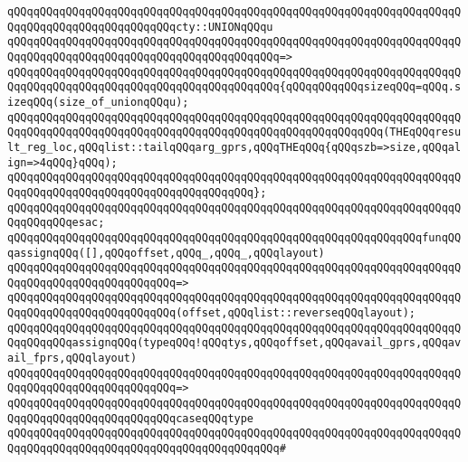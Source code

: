 \newline
\verb|qQQqqQQqqQQqqQQqqQQqqQQqqQQqqQQqqQQqqQQqqQQqqQQqqQQqqQQqqQQqqQQqqQQqqQQqqQQqqQQqqQQqqQQqqQQqqQQqcty::UNIONqQQqu|\newline
\verb|qQQqqQQqqQQqqQQqqQQqqQQqqQQqqQQqqQQqqQQqqQQqqQQqqQQqqQQqqQQqqQQqqQQqqQQqqQQqqQQqqQQqqQQqqQQqqQQqqQQqqQQqqQQqqQQq=>|\newline
\verb|qQQqqQQqqQQqqQQqqQQqqQQqqQQqqQQqqQQqqQQqqQQqqQQqqQQqqQQqqQQqqQQqqQQqqQQqqQQqqQQqqQQqqQQqqQQqqQQqqQQqqQQqqQQqqQQq{qQQqqQQqqQQqsizeqQQq=qQQq.sizeqQQq(size_of_unionqQQqu);|\newline
\newline
\verb|qQQqqQQqqQQqqQQqqQQqqQQqqQQqqQQqqQQqqQQqqQQqqQQqqQQqqQQqqQQqqQQqqQQqqQQqqQQqqQQqqQQqqQQqqQQqqQQqqQQqqQQqqQQqqQQqqQQqqQQqqQQqqQQq(THEqQQqresult_reg_loc,qQQqlist::tailqQQqarg_gprs,qQQqTHEqQQq{qQQqszb=>size,qQQqalign=>4qQQq}qQQq);|\newline
\verb|qQQqqQQqqQQqqQQqqQQqqQQqqQQqqQQqqQQqqQQqqQQqqQQqqQQqqQQqqQQqqQQqqQQqqQQqqQQqqQQqqQQqqQQqqQQqqQQqqQQqqQQqqQQq};|\newline
\verb|qQQqqQQqqQQqqQQqqQQqqQQqqQQqqQQqqQQqqQQqqQQqqQQqqQQqqQQqqQQqqQQqqQQqqQQqqQQqqQQqesac;|\newline
\newline
\newline
\verb|qQQqqQQqqQQqqQQqqQQqqQQqqQQqqQQqqQQqqQQqqQQqqQQqqQQqqQQqqQQqqQQqfunqQQqassignqQQq([],qQQqoffset,qQQq_,qQQq_,qQQqlayout)|\newline
\verb|qQQqqQQqqQQqqQQqqQQqqQQqqQQqqQQqqQQqqQQqqQQqqQQqqQQqqQQqqQQqqQQqqQQqqQQqqQQqqQQqqQQqqQQqqQQqqQQq=>|\newline
\verb|qQQqqQQqqQQqqQQqqQQqqQQqqQQqqQQqqQQqqQQqqQQqqQQqqQQqqQQqqQQqqQQqqQQqqQQqqQQqqQQqqQQqqQQqqQQqqQQq(offset,qQQqlist::reverseqQQqlayout);|\newline
\newline
\verb|qQQqqQQqqQQqqQQqqQQqqQQqqQQqqQQqqQQqqQQqqQQqqQQqqQQqqQQqqQQqqQQqqQQqqQQqqQQqqQQqassignqQQq(typeqQQq!qQQqtys,qQQqoffset,qQQqavail_gprs,qQQqavail_fprs,qQQqlayout)|\newline
\verb|qQQqqQQqqQQqqQQqqQQqqQQqqQQqqQQqqQQqqQQqqQQqqQQqqQQqqQQqqQQqqQQqqQQqqQQqqQQqqQQqqQQqqQQqqQQqqQQq=>|\newline
\verb|qQQqqQQqqQQqqQQqqQQqqQQqqQQqqQQqqQQqqQQqqQQqqQQqqQQqqQQqqQQqqQQqqQQqqQQqqQQqqQQqqQQqqQQqqQQqqQQqcaseqQQqtype|\newline
\verb|qQQqqQQqqQQqqQQqqQQqqQQqqQQqqQQqqQQqqQQqqQQqqQQqqQQqqQQqqQQqqQQqqQQqqQQqqQQqqQQqqQQqqQQqqQQqqQQqqQQqqQQqqQQqqQQq#|\newline
